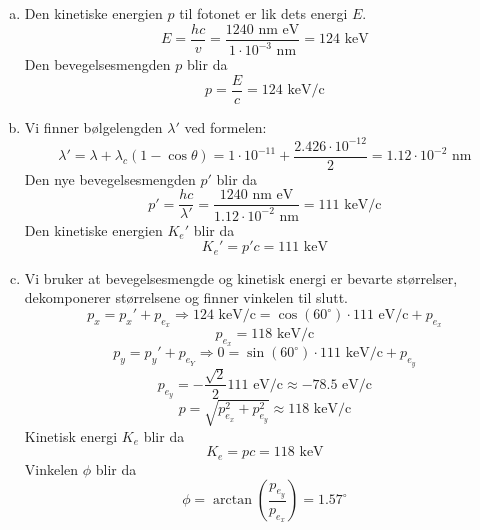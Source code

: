 \documentclass{article}
\begin{document}
\begin{enumerate}[a)]
\item
Den kinetiske energien $p$ til fotonet er lik dets energi $E$. 
\[
E = \frac{hc}{v} = \frac{1240 \text{ nm eV}}{1 ⋅ 10^{-3} \text{ nm}} = 124 \text{ keV}
\]
Den bevegelsesmengden $p$ blir da 
\[
p = \frac{E}{c} = 124 \text{ keV/c}
\]
\item
Vi finner bølgelengden $λ'$ ved formelen:
\[
λ' = λ + λ_c (1 - \cos θ) = 1 ⋅  10^{-11} + \frac{2.426 ⋅ 10^{-12}}{2} = 1.12 ⋅ 10^{-2} \text{ nm} 
\]
Den nye bevegelsesmengden $p'$ blir da
\[
p' = \frac{hc}{λ'} = \frac{1240 \text{ nm eV}}{1.12 ⋅ 10^{-2} \text{ nm}} = 111 \text{ keV/c}
\]
Den kinetiske energien $K_e'$ blir da 
\[
K_e' = p'c = 111 \text{ keV} 
\]
\item
Vi bruker at bevegelsesmengde og kinetisk energi er bevarte størrelser, dekomponerer størrelsene og finner vinkelen til slutt. 
\[
p_{x} = p_{x}' + p_{e_{x}} ⇒ 124 \text{ keV/c} = \cos \left( 60^∘ \right) ⋅  111 \text{ eV/c} + p_{e_{x}}
\]
\[
p_{e_{x}} = 118 \text{ keV/c}
\]
\[
p_y = p_y' + p_{e_{Y}} ⇒ 0 = \sin \left( 60^∘ \right) ⋅  111 \text{ keV/c} + p_{e_{y}}
\]
\[
p_{e_{y}} = - \frac{\sqrt{2}}{2} 111 \text{ eV/c} ≈ - 78.5 \text{ eV/c}
\]
\[
p = \sqrt{p_{e_{x}}^2 + p_{e_{y}}^2} ≈ 118 \text{ keV/c}
\]
Kinetisk energi $K_e$ blir da 
\[
K_e = pc = 118 \text{ keV}
\]
Vinkelen $ϕ$ blir da 
\[
ϕ = \arctan \left( \frac{p_{e_{y}}}{p_{e_{x}}} \right) = 1.57^∘
\]

\end{enumerate}
\end{document}

